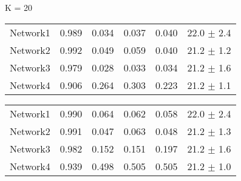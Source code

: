 \begin{table*}[h]

	\begin{minipage}[h]{0.45\linewidth} 
K = 20
\begin{tabular}{lrrrrr}

Network1         &   0.989 &      0.034 &   0.037 &   0.040 &  22.0 $\pm$ 2.4 \\
Network2       &   0.992 &      0.049 &   0.059 &     0.040 &  21.2 $\pm$ 1.2 \\
Network3       &   0.979 &      0.028 &   0.033 &     0.034 &  21.2 $\pm$ 1.6 \\
Network4        &   0.906 &      0.264 &   0.303 &    0.223 &  21.2 $\pm$ 1.1 \\
\hline
\end{tabular}
\end{minipage}
\hspace{0.8cm}
\begin{minipage}[h]{0.45\linewidth}
\begin{tabular}{lrrrrr}
Network1      &   0.990 &      0.064 &   0.062 &   0.058 &  22.0 $\pm$ 2.4 \\
Network2     &   0.991 &      0.047 &   0.063 &    0.048 &  21.2 $\pm$ 1.3 \\
Network3      &   0.982 &      0.152 &   0.151 &   0.197 &  21.2 $\pm$ 1.6 \\
Network4     &   0.939 &      0.498 &   0.505 &    0.505 &  21.2 $\pm$ 1.0 \\
\hline

\end{tabular}
\end{minipage}
\end{table*}




